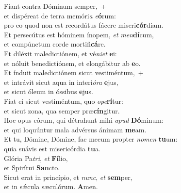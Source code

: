 \evenverse Fiant contra Dóminum semper,~+\\\evenverse  et dispéreat de terra memóri\textit{a} \textit{e}\textbf{ó}rum:~\*\\
\evenverse pro eo quod non est recordátus fácere miseri\textbf{cór}diam.\\
\oddverse Et persecútus est hóminem ínopem, \textit{et} \textit{men}\textbf{dí}cum,~\*\\
\oddverse et compúnctum corde mortifi\textbf{cá}re.\\
\evenverse Et diléxit maledictiónem, et vé\textit{ni}\textit{et} \textbf{e}i:~\*\\
\evenverse et nóluit benedictiónem, et elongábitur ab \textbf{e}o.\\
\oddverse Et índuit maledictiónem sicut vestiméntum,~+\\
\oddverse  et intrávit sicut aqua in interi\textit{ó}\textit{ra} \textbf{e}jus,~\*\\
\oddverse et sicut óleum in óssibus \textbf{e}jus.\\
\evenverse Fiat ei sicut vestiméntum, quo \textit{o}\textit{pe}\textbf{rí}tur:~\*\\
\evenverse et sicut zona, qua semper præ\textbf{cín}gitur.\\
\oddverse Hoc opus eórum, qui détrahunt mihi \textit{a}\textit{pud} \textbf{Dó}minum:~\*\\
\oddverse et qui loquúntur mala advérsus ánimam \textbf{me}am.\\
\evenverse Et tu, Dómine, Dómine, fac mecum propter \textit{no}\textit{men} \textbf{tu}um:~\*\\
\evenverse quia suávis est misericórdia \textbf{tu}a.\\
\oddverse Glória Pa\textit{tri}, \textit{et} \textbf{Fí}lio,~\*\\
\oddverse et Spirítui \textbf{San}cto.\\
\evenverse Sicut erat in princípio, et \textit{nunc}, \textit{et} \textbf{sem}per,~\*\\
\evenverse et in sǽcula sæculórum. \textbf{A}men.\\
